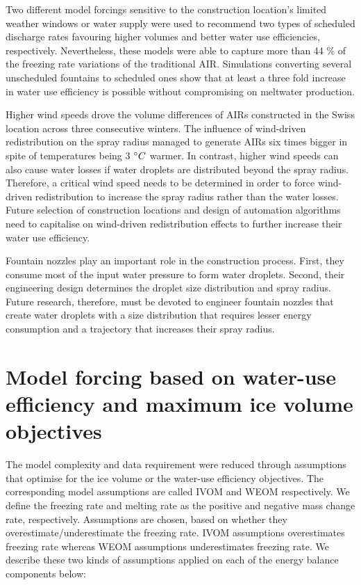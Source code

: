 \documentclass[tc, manuscript]{copernicus}
\begin{document}
Two different model forcings sensitive to the construction location's limited weather windows or water supply
were used to recommend two types of scheduled discharge rates favouring higher volumes and better water use
efficiencies, respectively. Nevertheless, these models were able to capture more than 44 \% of the freezing rate
variations of the traditional AIR. Simulations converting several unscheduled fountains to scheduled ones show
that at least a three fold increase in water use efficiency is possible without compromising on meltwater
production.

Higher wind speeds drove the volume differences of AIRs constructed in the Swiss location across three
consecutive winters. The influence of wind-driven redistribution on the spray radius managed to generate AIRs
six times bigger in spite of temperatures being 3 $^{\circ} C$ warmer. In contrast, higher wind speeds can also
cause water losses if water droplets are distributed beyond the spray radius. Therefore, a critical wind speed
needs to be determined in order to force wind-driven redistribution to increase the spray radius rather than the
water losses. Future selection of construction locations and design of automation algorithms need to capitalise
on wind-driven redistribution effects to further increase their water use efficiency.

Fountain nozzles play an important role in the construction process. First, they consume most of the input water
pressure to form water droplets. Second, their engineering design determines the droplet size distribution and
spray radius. Future research, therefore, must be devoted to engineer fountain nozzles that create water
droplets with a size distribution that requires lesser energy consumption and a trajectory that increases their
spray radius.

\appendix


\section{Model forcing based on water-use efficiency and maximum ice volume objectives} \label{sec:SEB}

The model complexity and data requirement \citep{balasubramanianInfluenceMeteorologicalConditions2022} were
reduced through assumptions that optimise for the ice volume or the water-use efficiency objectives. The
corresponding model assumptions are called IVOM and WEOM respectively. We define the freezing rate and melting
rate as the positive and negative mass change rate, respectively. Assumptions are chosen, based on whether they
overestimate/underestimate the freezing rate. IVOM assumptions overestimates freezing rate whereas WEOM
assumptions underestimates freezing rate. We describe these two kinds of assumptions applied on each of the
energy balance components below: 
\end{document}

